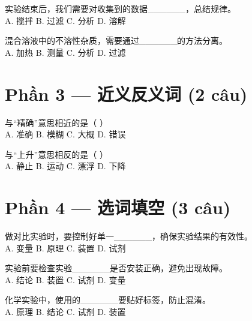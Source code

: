 \documentclass[11pt, a4paper]{article}
\begin{document}
\begin{baitap}[6]
实验结束后，我们需要对收集到的数据\_\_\_\_\_\_，总结规律。\\[4pt]
A. 搅拌 \quad B. 过滤 \quad C. 分析 \quad D. 溶解
\end{baitap}

\begin{baitap}[7]
混合溶液中的不溶性杂质，需要通过\_\_\_\_\_\_的方法分离。\\[4pt]
A. 加热 \quad B. 测量 \quad C. 分析 \quad D. 过滤
\end{baitap}

\section*{Phần 3 — 近义反义词 (2 câu)}

\begin{baitap}[8]
与“精确”意思相近的是（ ）\\[4pt]
A. 准确 \quad B. 模糊 \quad C. 大概 \quad D. 错误
\end{baitap}

\begin{baitap}[9]
与“上升”意思相反的是（ ）\\[4pt]
A. 静止 \quad B. 运动 \quad C. 漂浮 \quad D. 下降
\end{baitap}

\section*{Phần 4 — 选词填空 (3 câu)}

\begin{baitap}[10]
做对比实验时，要控制好单一\_\_\_\_\_\_，确保实验结果的有效性。\\[4pt]
A. 变量 \quad B. 原理 \quad C. 装置 \quad D. 试剂
\end{baitap}

\begin{baitap}[11]
实验前要检查实验\_\_\_\_\_\_是否安装正确，避免出现故障。\\[4pt]
A. 结论 \quad B. 装置 \quad C. 试剂 \quad D. 变量
\end{baitap}

\begin{baitap}[12]
化学实验中，使用的\_\_\_\_\_\_要贴好标签，防止混淆。\\[4pt]
A. 原理 \quad B. 结论 \quad C. 试剂 \quad D. 装置
\end{baitap}
\end{document}
